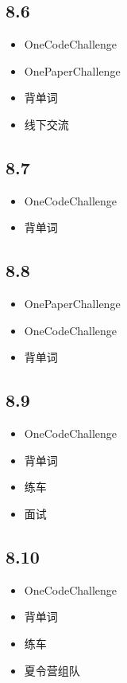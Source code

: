 \documentclass[UTF8]{ctexart}
\begin{document}
\subsection*{8.6}
\begin{itemize}
    \item OneCodeChallenge
    \item OnePaperChallenge
    \item 背单词
    \item 线下交流
\end{itemize}

\subsection*{8.7}
\begin{itemize}
    \item OneCodeChallenge
    \item 背单词
\end{itemize}

\subsection*{8.8}
\begin{itemize}
    \item OnePaperChallenge
    \item OneCodeChallenge
    \item 背单词
\end{itemize}

\subsection*{8.9}
\begin{itemize}
    \item OneCodeChallenge
    \item 背单词
    \item 练车
    \item 面试
\end{itemize}

\subsection*{8.10}
\begin{itemize}
    \item OneCodeChallenge
    \item 背单词
    \item 练车
    \item 夏令营组队
\end{itemize}
\end{document}
